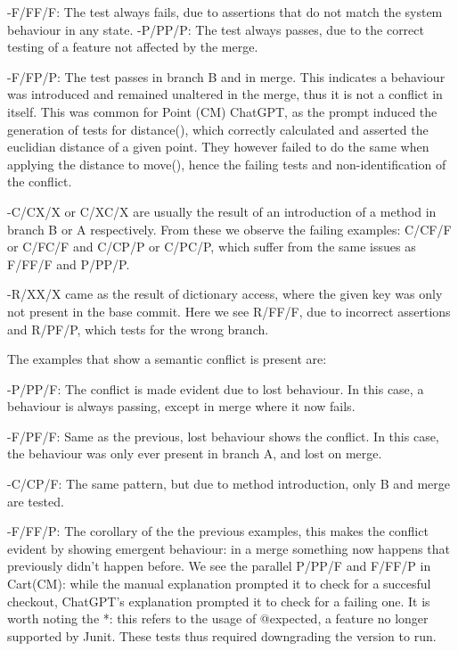 -F/FF/F: The test always fails, due to assertions that do not match the system behaviour in any state.
-P/PP/P: The test always passes, due to the correct testing of a feature not affected by the merge.

-F/FP/P: The test passes in branch B and in merge. This indicates a behaviour was introduced and remained unaltered in the merge, thus it is not a conflict in itself.
This was common for Point (CM) ChatGPT, as the prompt induced the generation of tests for distance(), which correctly calculated and asserted the euclidian distance of a given point.
They however failed to do the same when applying the distance to move(), hence the failing tests and non-identification of the conflict.

-C/CX/X or C/XC/X are usually the result of an introduction of a method in branch B or A respectively.
From these we observe the failing examples: C/CF/F or C/FC/F and C/CP/P or C/PC/P, which suffer from the same issues as F/FF/F and P/PP/P.

-R/XX/X came as the result of dictionary access, where the given key was only not present in the base commit.
Here we see R/FF/F, due to incorrect assertions and R/PF/P, which tests for the wrong branch.


The examples that show a semantic conflict is present are:

-P/PP/F: The conflict is made evident due to lost behaviour. In this case, a behaviour is always passing, except in merge where it now fails.

-F/PF/F: Same as the previous, lost behaviour shows the conflict. In this case, the behaviour was only ever present in branch A, and lost on merge.

-C/CP/F: The same pattern, but due to method introduction, only B and merge are tested.

-F/FF/P: The corollary of the the previous examples, this makes the conflict evident by showing emergent behaviour: in a merge something now happens that previously didn't happen before.
We see the parallel P/PP/F and F/FF/P in Cart(CM): while the manual explanation prompted it to check for a succesful checkout, ChatGPT's explanation prompted it to check for a failing one.
It is worth noting the *: this refers to the usage of @expected, a feature no longer supported by Junit. These tests thus required downgrading the version to run.


